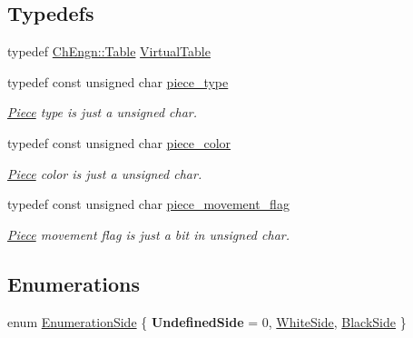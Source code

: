 \subsection*{Typedefs}
\begin{DoxyCompactItemize}
\item 
typedef \hyperlink{classChEngn_1_1Table}{ChEngn::Table} \hyperlink{namespaceChEngn_a5ba229504d25ed1b2086f1df62f6db41}{VirtualTable}
\item 
\hypertarget{namespaceChEngn_a2a35c185f259757a78e937575b8ed483}{
typedef const unsigned char \hyperlink{namespaceChEngn_a2a35c185f259757a78e937575b8ed483}{piece\_\-type}}
\label{namespaceChEngn_a2a35c185f259757a78e937575b8ed483}

\begin{DoxyCompactList}\small\item\em \hyperlink{classChEngn_1_1Piece}{Piece} type is just a unsigned char. \item\end{DoxyCompactList}\item 
\hypertarget{namespaceChEngn_a9c81426c0134a97288a226c122daf62f}{
typedef const unsigned char \hyperlink{namespaceChEngn_a9c81426c0134a97288a226c122daf62f}{piece\_\-color}}
\label{namespaceChEngn_a9c81426c0134a97288a226c122daf62f}

\begin{DoxyCompactList}\small\item\em \hyperlink{classChEngn_1_1Piece}{Piece} color is just a unsigned char. \item\end{DoxyCompactList}\item 
\hypertarget{namespaceChEngn_a491b2eba2f766087f4f28948005ab16a}{
typedef const unsigned char \hyperlink{namespaceChEngn_a491b2eba2f766087f4f28948005ab16a}{piece\_\-movement\_\-flag}}
\label{namespaceChEngn_a491b2eba2f766087f4f28948005ab16a}

\begin{DoxyCompactList}\small\item\em \hyperlink{classChEngn_1_1Piece}{Piece} movement flag is just a bit in unsigned char. \item\end{DoxyCompactList}\end{DoxyCompactItemize}
\subsection*{Enumerations}
\begin{DoxyCompactItemize}
\item 
enum \hyperlink{namespaceChEngn_a680bcca190861d8cee0f8627ce8f9de3}{EnumerationSide} \{ {\bfseries UndefinedSide} =  0, 
\hyperlink{namespaceChEngn_a680bcca190861d8cee0f8627ce8f9de3a1216fa4a94b6a39e924f5965c2f077c8}{WhiteSide}, 
\hyperlink{namespaceChEngn_a680bcca190861d8cee0f8627ce8f9de3a957467874ae046942182f37a5dd95cf1}{BlackSide}
 \}
\end{DoxyCompactItemize}
